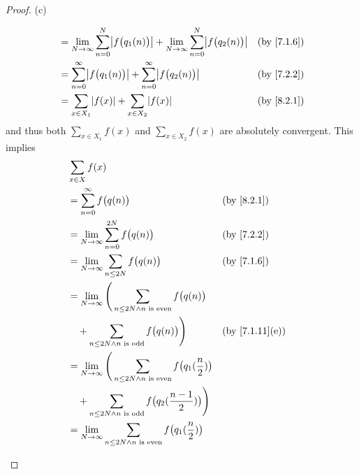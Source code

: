 \begin{proof}{(c)}
\begin{itemize}
\begin{align*}
			       & = \lim_{N \to \infty} \sum_{n = 0}^N \abs{f\big(q_1(n)\big)} + \lim_{N \to \infty} \sum_{n = 0}^N \abs{f\big(q_2(n)\big)} &  & \by{7.1.6}                   \\
			       & = \sum_{n = 0}^\infty \abs{f\big(q_1(n)\big)} + \sum_{n = 0}^\infty \abs{f\big(q_2(n)\big)}                               &  & \by{7.2.2}                   \\
			       & = \sum_{x \in X_1} \abs{f(x)} + \sum_{x \in X_2} \abs{f(x)}                                                               &  & \by{8.2.1}
		      \end{align*}
		      and thus both \(\sum_{x \in X_1} f(x)\) and \(\sum_{x \in X_2} f(x)\) are absolutely convergent.
		      This implies
		      \begin{align*}
			       & \sum_{x \in X} f(x)                                                                                                                             \\
			       & = \sum_{n = 0}^\infty f\big(q(n)\big)                                                                         &  & \by{8.2.1}                   \\
			       & = \lim_{N \to \infty} \sum_{n = 0}^{2N} f\big(q(n)\big)                                                       &  & \by{7.2.2}                   \\
			       & = \lim_{N \to \infty} \sum_{n \leq 2N} f\big(q(n)\big)                                                        &  & \by{7.1.6}                   \\
			       & = \lim_{N \to \infty} \Bigg(\sum_{n \leq 2N \land n \text{ is even}} f\big(q(n)\big)                                                            \\
			       & \quad + \sum_{n \leq 2N \land n \text{ is odd}} f\big(q(n)\big)\Bigg)                                         &  & \text{(by \cref{7.1.11}(e))} \\
			       & = \lim_{N \to \infty} \Bigg(\sum_{n \leq 2N \land n \text{ is even}} f\big(q_1(\dfrac{n}{2})\big)                                               \\
			       & \quad + \sum_{n \leq 2N \land n \text{ is odd}} f\big(q_2(\dfrac{n - 1}{2})\big)\Bigg)                                                          \\
			       & = \lim_{N \to \infty} \sum_{n \leq 2N \land n \text{ is even}} f\big(q_1(\dfrac{n}{2})\big)                                                     \\

\end{align*}
\end{itemize}
\end{proof}
